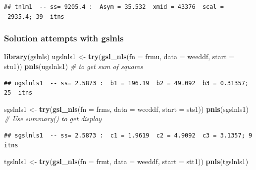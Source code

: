 \documentclass[
]{article}
\newenvironment{Shaded}{\begin{snugshade}}{\end{snugshade}}
\newcommand{\AttributeTok}[1]{\textcolor[rgb]{0.13,0.29,0.53}{#1}}
\newcommand{\CommentTok}[1]{\textcolor[rgb]{0.56,0.35,0.01}{\textit{#1}}}
\newcommand{\FunctionTok}[1]{\textcolor[rgb]{0.13,0.29,0.53}{\textbf{#1}}}
\newcommand{\NormalTok}[1]{#1}
\newcommand{\OtherTok}[1]{\textcolor[rgb]{0.56,0.35,0.01}{#1}}
\begin{document}
\begin{verbatim}
## tnlm1  -- ss= 9205.4 :  Asym = 35.532  xmid = 43376  scal = -2935.4; 39  itns
\end{verbatim}

\hypertarget{solution-attempts-with-gslnls}{%
\subsubsection{Solution attempts with
gslnls}\label{solution-attempts-with-gslnls}}

\begin{Shaded}
\begin{Highlighting}[]
\FunctionTok{library}\NormalTok{(gslnls)}
\NormalTok{ugslnls1 }\OtherTok{\textless{}{-}} \FunctionTok{try}\NormalTok{(}\FunctionTok{gsl\_nls}\NormalTok{(}\AttributeTok{fn =}\NormalTok{ frmu, }\AttributeTok{data =}\NormalTok{ weeddf,  }\AttributeTok{start =}\NormalTok{ stu1))}
\FunctionTok{pnls}\NormalTok{(ugslnls1) }\CommentTok{\# to get sum of squares}
\end{Highlighting}
\end{Shaded}

\begin{verbatim}
## ugslnls1  -- ss= 2.5873 :  b1 = 196.19  b2 = 49.092  b3 = 0.31357; 25  itns
\end{verbatim}

\begin{Shaded}
\begin{Highlighting}[]
\NormalTok{sgslnls1 }\OtherTok{\textless{}{-}} \FunctionTok{try}\NormalTok{(}\FunctionTok{gsl\_nls}\NormalTok{(}\AttributeTok{fn =}\NormalTok{ frms, }\AttributeTok{data =}\NormalTok{ weeddf,  }\AttributeTok{start =}\NormalTok{ sts1))}
\FunctionTok{pnls}\NormalTok{(sgslnls1) }\CommentTok{\# Use summary() to get display}
\end{Highlighting}
\end{Shaded}

\begin{verbatim}
## sgslnls1  -- ss= 2.5873 :  c1 = 1.9619  c2 = 4.9092  c3 = 3.1357; 9  itns
\end{verbatim}

\begin{Shaded}
\begin{Highlighting}[]
\NormalTok{tgslnls1 }\OtherTok{\textless{}{-}} \FunctionTok{try}\NormalTok{(}\FunctionTok{gsl\_nls}\NormalTok{(}\AttributeTok{fn =}\NormalTok{ frmt, }\AttributeTok{data =}\NormalTok{ weeddf,  }\AttributeTok{start =}\NormalTok{ stt1))}
\FunctionTok{pnls}\NormalTok{(tgslnls1) }
\end{Highlighting}
\end{Shaded}
\end{document}
